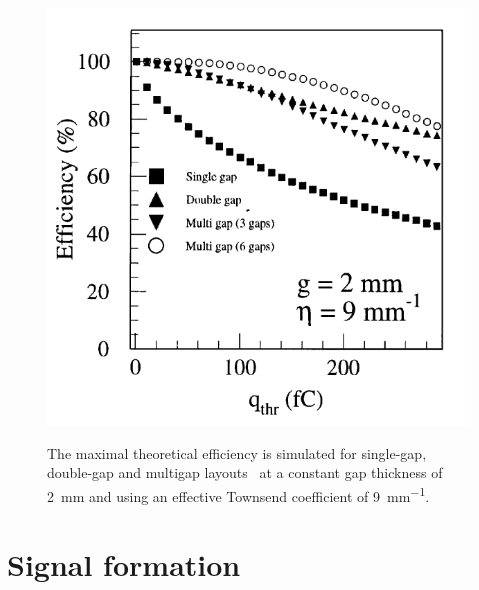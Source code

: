 	\begin{figure}[H]
		\centering
		\includegraphics[width = 0.6\plotwidth]{fig/chapt4/Layout_eff_vs_thr.png}\\
		\caption{\label{fig:EffThreshold} The maximal theoretical efficiency is simulated for single-gap, double-gap and multigap layouts~\cite{ABBRESCIA99} at a constant gap thickness of \SI{2}{mm} and using an effective Townsend coefficient of \SI{9}{mm^{-1}}.}
	\end{figure}

\section{Signal formation}
\label{chapt4:sec:signal}
	
